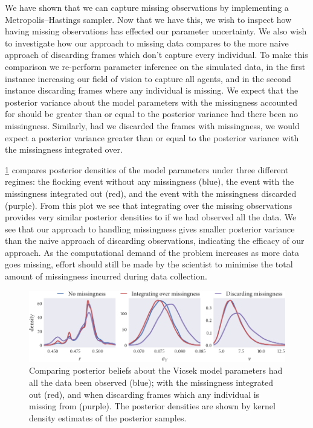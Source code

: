 We have shown that we can capture missing observations by implementing a
Metropolis--Hastings sampler. Now that we have this, we wish to inspect how
having missing observations has effected our parameter uncertainty. We also
wish to investigate how our approach to missing data compares to the more
naive approach of discarding frames which don't capture every individual. To
make this comparison we re-perform parameter inference on the simulated data,
in the first instance increasing our field of vision to capture all
agents, and in the second instance discarding frames where any individual is
missing. We expect that the posterior variance about the model parameters with
the missingness accounted for should be greater than or equal to the posterior
variance had there been no missingness. Similarly, had we discarded the frames
with missingness, we would expect a posterior variance greater than or equal to
the posterior variance with the missingness integrated over. 

\cref{fig:beg_compare} compares posterior densities of the model parameters
under three different regimes: the flocking event without any missingness
(blue), the event with the missingness integrated out (red), and the event with
the missingness discarded (purple). From this plot we see that integrating over
the missing observations provides very similar posterior densities to if we had
observed all the data. We see that our approach to handling missingness gives
smaller posterior variance than the naive approach of discarding observations,
indicating the efficacy of our approach. As the computational demand of the
problem increases as more data goes missing, effort should still be made by the
scientist to minimise the total amount of missingness incurred during data
collection.

\begin{figure}[tbp]
  \includegraphics{beg/compare_params.pdf}
  \caption{Comparing posterior beliefs about the Vicsek model parameters had
    all the data been observed (blue); with the missingness integrated out
    (red), and when discarding frames which any individual is missing from
    (purple). The posterior densities are shown by kernel density estimates
    of the posterior samples.}
  \label{fig:beg_compare}
\end{figure}

